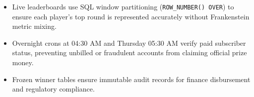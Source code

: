 \begin{tcolorbox}[summarybox, title={Chapter Key Takeaways}]
\begin{itemize}
    \item Live leaderboards use SQL window partitioning (\texttt{ROW\_NUMBER() OVER}) to ensure each player's top round is represented accurately without Frankenstein metric mixing.
    \item Overnight crons at 04:30 AM and Thursday 05:30 AM verify paid subscriber status, preventing unbilled or fraudulent accounts from claiming official prize money.
    \item Frozen winner tables ensure immutable audit records for finance disbursement and regulatory compliance.
\end{itemize}
\end{tcolorbox}
